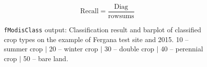 \begin{equation}
\label{eq:recall}
   \text{Recall} = \frac{\text{Diag}}{\text{rowsums}} 
\end{equation}


\begin{figure}[H]
	\centering{}
	\centering{}
	\caption{\texttt{fModisClass} output: Classification result and barplot of classified crop types on the example of Fergana test site and 2015. 10 -- summer crop $|$ 20 -- winter crop $|$ 30 -- double crop $|$ 40 -- perennial crop $|$ 50 -- bare land.}\label{fig:fModisClass}
\end{figure}


